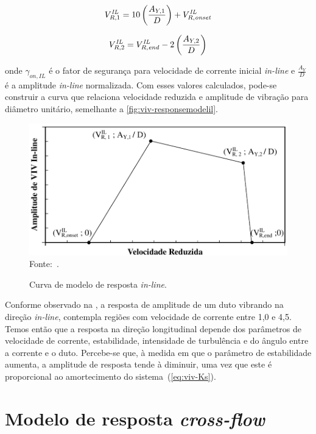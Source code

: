 \begin{equation}
V_{R, 1}^\mathit{IL} = 10 \left(\frac{A_{Y, 1}}{D}\right)+ V_{R,\mathit{onset}}^\mathit{IL}\\
\end{equation}

\begin{equation}
V_{R, 2}^\mathit{IL} =  V_{R, \mathit{end}}^\mathit{IL} - 2 \left(\frac{A_{Y, 2}}{D}\right)\\
\end{equation}

onde $\gamma_{\mathit{on}, \mathit{IL}}$ é o fator de segurança para velocidade de corrente inicial \textit{in-line} e $\frac{A_Y}{D}$ é a amplitude \textit{in-line} normalizada. Com esses valores calculados, pode-se construir a curva que relaciona velocidade reduzida e amplitude de vibração para diâmetro unitário, semelhante a \autoref{fig:viv-responsemodelil}.

\begin{figure}[!ht]
    \centering
    \caption{Curva de modelo de resposta \textit{in-line}.}\label{fig:viv-responsemodelil}
    \includegraphics[width=0.8\linewidth]{imagens/response_model_IL}
    \\Fonte:~.
\end{figure}

Conforme observado na , a resposta de amplitude de um duto vibrando na direção \textit{in-line}, contempla regiões com velocidade de corrente entre 1,0 e 4,5.
Temos então que a resposta na direção longitudinal depende dos parâmetros de velocidade de corrente, estabilidade, intensidade de turbulência e do ângulo entre a corrente e o duto.
Percebe-se que, à medida em que o parâmetro de estabilidade aumenta, a amplitude de resposta tende à diminuir, uma vez que este é proporcional ao amortecimento do sistema~(\autoref{eq:viv-Ks}).


\section{Modelo de resposta \textit{cross-flow}}

